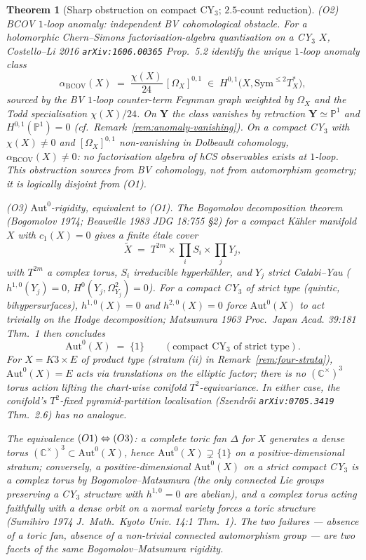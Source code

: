 \documentclass[11pt]{amsart}
\newtheorem{theorem}{Theorem}[section]
\theoremstyle{definition}
\providecommand{\bY}{\mathbf{Y}}
\providecommand{\bC}{\mathbb{C}}
\providecommand{\bP}{\mathbb{P}}
\begin{document}
\begin{theorem}[Sharp obstruction on compact CY$_3$; $2.5$-count reduction]
\smallskip
\emph{\textup{(O2)} BCOV $1$-loop anomaly: independent BV
cohomological obstacle.}
For a holomorphic Chern--Simons factorisation-algebra quantisation on
a CY$_3$ $X$, Costello--Li 2016 \texttt{arXiv:1606.00365} Prop.~5.2
identify the unique $1$-loop anomaly class
\[
  \alpha_{\mathrm{BCOV}}(X)
  \;=\; \frac{\chi(X)}{24}\,[\Omega_X]^{0,1}
  \;\in\; H^{0,1}\!\bigl(X, \mathrm{Sym}^{\leq 2} T_X^*\bigr),
\]
sourced by the BV $1$-loop counter-term Feynman graph weighted by
$\Omega_X$ and the Todd specialisation $\chi(X)/24$. On $\bY$ the
class vanishes by retraction $\bY \simeq \bP^1$ and $H^{0,1}(\bP^1)
= 0$ (\emph{cf}.\ Remark~\ref{rem:anomaly-vanishing}). On a compact
CY$_3$ with $\chi(X) \neq 0$ and $[\Omega_X]^{0,1}$ non-vanishing in
Dolbeault cohomology, $\alpha_{\mathrm{BCOV}}(X) \neq 0$: no
factorisation algebra of hCS observables exists at $1$-loop. This
obstruction sources from BV cohomology, \emph{not} from automorphism
geometry; it is logically disjoint from (O1).

\smallskip
\emph{\textup{(O3)} $\mathrm{Aut}^0$-rigidity, equivalent to
\textup{(O1)}.}
The Bogomolov decomposition theorem (Bogomolov 1974; Beauville 1983
\emph{JDG} 18:755 \S 2) for a compact K\"ahler manifold $X$ with
$c_1(X) = 0$ gives a finite \'etale cover
\[
  \widetilde X \;=\; T^{2m} \times \prod_i S_i \times \prod_j Y_j,
\]
with $T^{2m}$ a complex torus, $S_i$ irreducible hyperk\"ahler, and
$Y_j$ strict Calabi--Yau ($h^{1,0}(Y_j) = 0$, $H^0(Y_j,
\Omega^2_{Y_j}) = 0$). For a compact CY$_3$ of strict type (quintic,
bihypersurfaces), $h^{1,0}(X) = 0$ and $h^{2,0}(X) = 0$ force
$\mathrm{Aut}^0(X)$ to act trivially on the Hodge decomposition;
Matsumura 1963 \emph{Proc.\ Japan Acad.} 39:181 Thm.~1 then concludes
\[
  \mathrm{Aut}^0(X) \;=\; \{1\}
  \qquad (\text{compact CY$_3$ of strict type}).
\]
For $X = K3 \times E$ of product type (stratum (ii) in
Remark~\ref{rem:four-strata}), $\mathrm{Aut}^0(X) = E$ acts via
translations on the elliptic factor; there is no $(\bC^\times)^3$
torus action lifting the chart-wise conifold $T^2$-equivariance. In
either case, the conifold's $T^2$-fixed pyramid-partition
localisation (Szendr\H{o}i \texttt{arXiv:0705.3419} Thm.~2.6) has no
analogue.

The equivalence $\textup{(O1)} \Leftrightarrow \textup{(O3)}$: a
complete toric fan $\Delta$ for $X$ generates a dense torus
$(\bC^\times)^3 \subset \mathrm{Aut}^0(X)$, hence $\mathrm{Aut}^0(X)
\supsetneq \{1\}$ on a positive-dimensional stratum; conversely, a
positive-dimensional $\mathrm{Aut}^0(X)$ on a strict compact CY$_3$
is a complex torus by Bogomolov--Matsumura (the only connected Lie
groups preserving a CY$_3$ structure with $h^{1,0} = 0$ are
abelian), and a complex torus acting faithfully with a dense orbit
on a normal variety forces a toric structure (Sumihiro 1974
\emph{J.\ Math.\ Kyoto Univ.} 14:1 Thm.~1). The two failures ---
absence of a toric fan, absence of a non-trivial connected
automorphism group --- are two facets of the same
Bogomolov--Matsumura rigidity.


\end{theorem}
\end{document}
